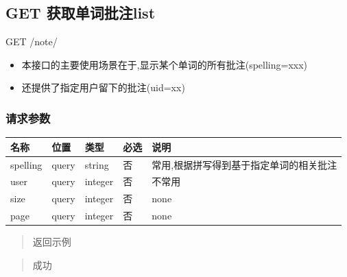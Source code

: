 \documentclass[
]{article}
\begin{document}
\hypertarget{get-ux83b7ux53d6ux5355ux8bcdux6279ux6ce8list}{%
\subsection{GET
获取单词批注list}\label{get-ux83b7ux53d6ux5355ux8bcdux6279ux6ce8list}}

GET /note/

\begin{itemize}
\item
  本接口的主要使用场景在于,显示某个单词的所有批注(spelling=xxx)
\item
  还提供了指定用户留下的批注(uid=xx)
\end{itemize}

\hypertarget{ux8bf7ux6c42ux53c2ux6570-2}{%
\subsubsection{请求参数}\label{ux8bf7ux6c42ux53c2ux6570-2}}

\begin{longtable}[]{@{}lllll@{}}
\toprule
名称 & 位置 & 类型 & 必选 & 说明 \\
\midrule
\endhead
spelling & query & string & 否 &
常用,根据拼写得到基于指定单词的相关批注 \\
user & query & integer & 否 & 不常用 \\
size & query & integer & 否 & none \\
page & query & integer & 否 & none \\
\bottomrule
\end{longtable}

\begin{quote}
返回示例
\end{quote}

\begin{quote}
成功
\end{quote}
\end{document}
